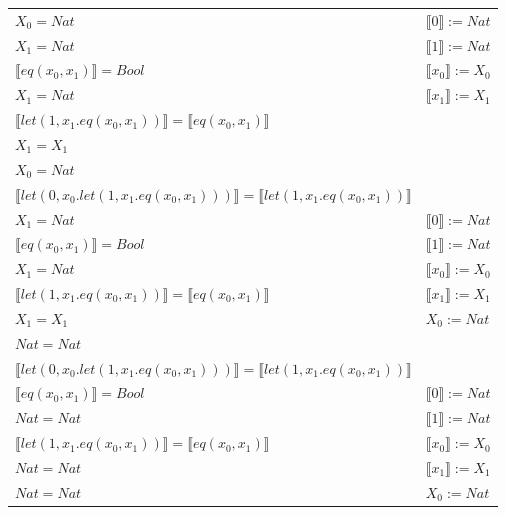 \begin{exercise}
\begin{description}
\begin{center}
\begin{longtable}{ | l | l | }
                      \hline
 		   $X_0 = Nat$   &  $ \llbracket 0 \rrbracket := Nat$ \\
                        $ X_1 = Nat $  & $ \llbracket 1 \rrbracket := Nat$ \\
                        $ \llbracket eq(x_0,x_1) \rrbracket = Bool$  & $ \llbracket x_0 \rrbracket := X_0$  \\
                        $X_1 = Nat$ & $ \llbracket x_1 \rrbracket := X_1$ \\
                        $ \llbracket let(1,x_1.eq(x_0,x_1)) \rrbracket =  \llbracket eq(x_0,x_1) \rrbracket$  &   \\
                        $X_1 = X_1$  & \\
                        $X_0 = Nat$ & \\
                        $ \llbracket let(0,x_0.let(1,x_1.eq(x_0,x_1))) \rrbracket =  \llbracket let(1,x_1.eq(x_0,x_1)) \rrbracket$ & \\
                      \hline
                        $ X_1 = Nat $  &  $ \llbracket 0 \rrbracket := Nat$ \\ 
                        $ \llbracket eq(x_0,x_1) \rrbracket = Bool$  &  $ \llbracket 1 \rrbracket := Nat$ \\ 
                        $X_1 = Nat$ & $ \llbracket x_0 \rrbracket := X_0$  \\ 
                        $ \llbracket let(1,x_1.eq(x_0,x_1)) \rrbracket =  \llbracket eq(x_0,x_1) \rrbracket$  & $ \llbracket x_1 \rrbracket := X_1$ \\  
                        $X_1 = X_1$  & $X_0 := Nat$ \\
                        $Nat = Nat$ & \\
                        $ \llbracket let(0,x_0.let(1,x_1.eq(x_0,x_1))) \rrbracket =  \llbracket let(1,x_1.eq(x_0,x_1)) \rrbracket$ & \\
                      \hline
                        $ \llbracket eq(x_0,x_1) \rrbracket = Bool$  &  $ \llbracket 0 \rrbracket := Nat$ \\  
                        $Nat = Nat$ &  $ \llbracket 1 \rrbracket := Nat$ \\  
                        $ \llbracket let(1,x_1.eq(x_0,x_1)) \rrbracket =  \llbracket eq(x_0,x_1) \rrbracket$  & $ \llbracket x_0 \rrbracket := X_0$  \\  
                        $Nat = Nat$  & $ \llbracket x_1 \rrbracket := X_1$ \\  
                        $Nat = Nat$ & $X_0 := Nat$ \\ 

\end{longtable}
\end{center}
\end{description}
\end{exercise}
